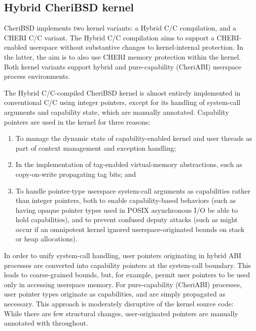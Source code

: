 \documentclass[12pt,twoside,openright,a4paper]{article}
\newcommand{\ccode}[1]{{\small\ttfamily{#1}}}
\newcommand{\uucap}{{\ccode{\_\_capability}}\xspace}
\newcommand*{\cpp}{\texorpdfstring{C\textsmaller[2]{\protect\nolinebreak[4]\hspace{-.05em}\raisebox{.45ex}{\textbf{++}}}}{C++}}
\newcommand*{\COrCpp}{C/\cpp{}}
\newcommand*{\purecapCOrCpp}{CHERI \COrCpp{}}
\newcommand*{\hybridCOrCpp}{Hybrid \COrCpp{}}
\begin{document}
\subsection{Hybrid CheriBSD kernel}

CheriBSD implements two kernel variants: a \hybridCOrCpp{} compilation, and a
\purecapCOrCpp{} variant.
The \hybridCOrCpp{} compilation aims to support a CHERI-enabled userspace
without substantive changes to kernel-internal protection.
In the latter, the aim is to also use CHERI memory protection within the
kernel.
Both kernel variants support hybrid and pure-capability (CheriABI) userspace
process environments.

The \hybridCOrCpp{}-compiled CheriBSD kernel is almost entirely implemented
in conventional \COrCpp{} using integer pointers, except for its handling of
system-call arguments and capability state, which are manually annotated.
Capability pointers are used in the kernel for three reasons:

\begin{enumerate}
\item To manage the dynamic state of capability-enabled kernel and user
  threads as part of context management and exception handling;

\item In the implementation of tag-enabled virtual-memory abstractions, such
  as copy-on-write propagating tag bits; and

\item To handle pointer-type userspace system-call arguments as capabilities
  rather than integer pointers, both to enable capability-based behaviors
  (such as having opaque pointer types used in POSIX asynchronous I/O be able
  to hold capabilities), and to prevent confused deputy attacks (such as might
  occur if an omnipotent kernel ignored userspace-originated bounds on stack
  or heap allocations).
\end{enumerate}

In order to unify system-call handling, user pointers originating in hybrid
ABI processes are converted into capability pointers at the system-call
boundary.
This leads to coarse-grained bounds, but, for example, permit user pointers to
be used only in accessing userspace memory.
For pure-capability (CheriABI) processes, user pointer types originate as
capabilities, and are simply propagated as necessary.
This approach is moderately disruptive of the kernel source code: While there
are few structural changes, user-originated pointers are manually annotated
with \uucap{} throughout.
\end{document}
